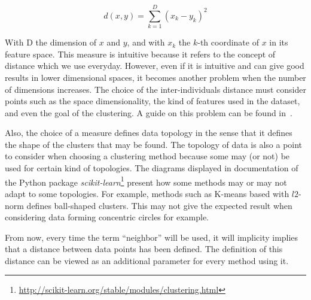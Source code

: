     \begin{equation}
    d\left(x,y\right) = \sum_{k=1}^D {\left(x_k - y_k\right)}^2
    \end{equation}

    With D the dimension of $x$ and $y$, and with $x_k$ the $k$-th coordinate of $x$ in its feature space. This measure is intuitive because it refers to the concept of distance which we use everyday. However, even if it is intuitive and can give good results in lower dimensional spaces, it becomes another problem when the number of dimensions increases. The choice of the inter-individuals distance must consider points such as the space dimensionality, the kind of features used in the dataset, and even the goal of the clustering. A guide on this problem can be found in~\cite{domingos2012few}.

    Also, the choice of a measure defines data topology in the sense that it defines the shape of the clusters that may be found. The topology of data is also a point to consider when choosing a clustering method because some may (or not) be used for certain kind of topologies. The diagrams displayed in documentation of the Python package \textit{scikit-learn}\footnote{\url{http://scikit-learn.org/stable/modules/clustering.html}} present how some methods may or may not adapt to some topologies. For example, methods such as K-means based with $l2$-norm defines ball-shaped clusters. This may not give the expected result when considering data forming concentric circles for example.

    From now, every time the term ``neighbor'' will be used, it will implicity implies that a distance between data points has been defined. The definition of this distance can be viewed as an additional parameter for every method using it.

